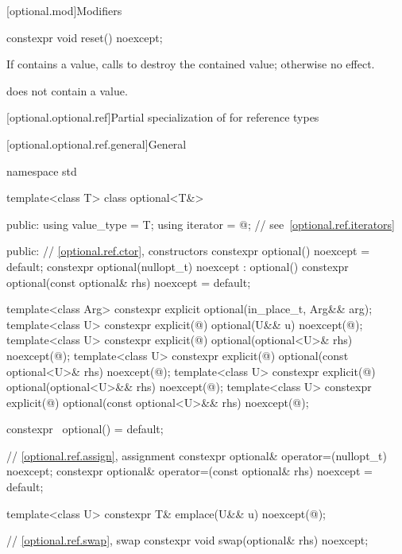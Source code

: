 [optional.mod]{Modifiers}

%
\begin{itemdecl}
constexpr void reset() noexcept;
\end{itemdecl}

\begin{itemdescr}
\pnum
\effects
If  contains a value, calls  to destroy the contained value;
otherwise no effect.

\pnum
\ensures
{} does not contain a value.
\end{itemdescr}

[optional.optional.ref]{Partial specialization of  for reference types}

[optional.optional.ref.general]{General}
\begin{codeblock}
namespace std {
  template<class T>
  class optional<T&> {
    public:
      using value_type     = T;
      using iterator       = @\impdefnc@;            // see~\ref{optional.ref.iterators}

    public:
      // \ref{optional.ref.ctor}, constructors
      constexpr optional() noexcept = default;
      constexpr optional(nullopt_t) noexcept : optional() {}
      constexpr optional(const optional& rhs) noexcept = default;

      template<class Arg>
        constexpr explicit optional(in_place_t, Arg&& arg);
      template<class U>
        constexpr explicit(@\seebelow@) optional(U&& u) noexcept(@\seebelow@);
      template<class U>
        constexpr explicit(@\seebelow@) optional(optional<U>& rhs) noexcept(@\seebelow@);
      template<class U>
        constexpr explicit(@\seebelow@) optional(const optional<U>& rhs) noexcept(@\seebelow@);
      template<class U>
        constexpr explicit(@\seebelow@) optional(optional<U>&& rhs) noexcept(@\seebelow@);
      template<class U>
        constexpr explicit(@\seebelow@) optional(const optional<U>&& rhs) noexcept(@\seebelow@);

      constexpr ~optional() = default;

      // \ref{optional.ref.assign}, assignment
      constexpr optional& operator=(nullopt_t) noexcept;
      constexpr optional& operator=(const optional& rhs) noexcept = default;

      template<class U> constexpr T& emplace(U&& u) noexcept(@\seebelow@);

      // \ref{optional.ref.swap}, swap
      constexpr void swap(optional& rhs) noexcept;

}}
\end{codeblock}
